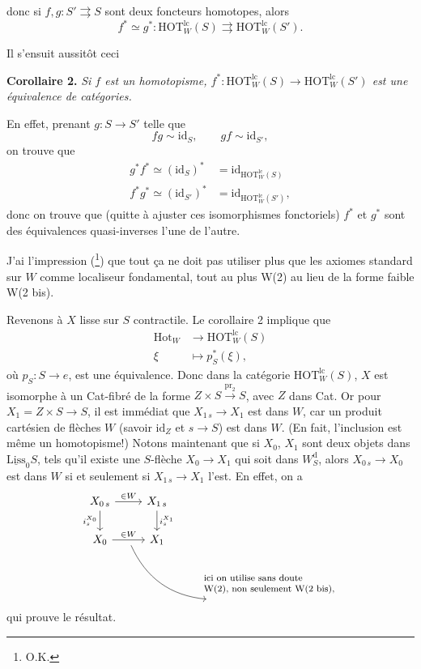 \documentclass[11pt]{article}
\newcommand{\printedpage}[1]{\marginpar{\footnotesize p.~#1}}
\newcommand{\msp}[1]{\marginpar{\footnotesize [#1]}}
\newcommand{\HOTlc}{\mathrm{HOT}^{\mathrm{lc}}_W}
\newcommand{\Hot}{\mathrm{Hot}}
\newcommand{\id}{\mathrm{id}}
\newcommand{\Wd}{W^{\mathrm{d}}_S}
\begin{document}
\printedpage{34}

\msp{page 46}
donc si $f,g : S' \rightrightarrows S$ sont deux foncteurs homotopes, alors
\[ f^* \simeq g^* : \HOTlc(S) \rightrightarrows \HOTlc(S'). \]

Il s'ensuit aussitôt ceci

\textbf{Corollaire 2.} \textit{Si $f$ est un homotopisme, $f^* : \HOTlc(S) \longrightarrow \HOTlc(S')$ est une équivalence de catégories.}

En effet, prenant $g : S \longrightarrow S'$ telle que
\[ fg \sim \id_S, \qquad gf \sim \id_{S'}, \]
on trouve que
\[ \begin{aligned}
g^*f^* \simeq (\id_S)^* &= \id_{\HOTlc(S)} \\
f^*g^* \simeq (\id_{S'})^* &= \id_{\HOTlc(S')},
\end{aligned} \]
donc on trouve que (quitte à ajuster ces isomorphismes fonctoriels) $f^*$ et $g^*$ sont des équivalences quasi-inverses l'une de l'autre.

J'ai l'impression (\footnote[54]{O.K.}) que tout ça ne doit pas utiliser plus que les axiomes standard sur $W$ comme localiseur fondamental, tout au plus W(2) au lieu de la forme faible W(2 bis).

Revenons à $X$ lisse sur $S$ contractile. Le corollaire 2 implique que
\[ \begin{aligned}
\Hot_W &\longrightarrow \HOTlc(S) \\
\xi &\longmapsto p^*_S(\xi),
\end{aligned} \]
où $p_S : S \longrightarrow e$, est une équivalence. Donc dans la catégorie $\HOTlc(S)$, $X$ est isomorphe \msp{page 47} à un Cat-fibré de la forme $Z \times S \xrightarrow{\mathrm{pr}_2} S$, avec $Z$ dans Cat. Or pour $X_1 = Z \times S \longrightarrow S$, il est immédiat que $X_{1\,s} \longrightarrow X_1$ est dans $W$, car un produit cartésien de flèches $W$ (savoir $\id_Z$ et $s \longrightarrow S$) est dans $W$. (En fait, l'inclusion est même un homotopisme!) Notons maintenant que si $X_0$, $X_1$ sont deux objets dans $\underline{\mathrm{Liss}}_0S$, tels qu'il existe une $S$-flèche $X_0 \longrightarrow X_1$ qui soit dans $\Wd$, alors $X_{0\,s} \longrightarrow X_0$ est dans $W$ si et seulement si $X_{1\,s} \longrightarrow X_1$ l'est. En effet, on a
\[ \begin{tikzcd}
X_{0\,s} \arrow[r, "\in W"] \arrow[d, "i_s^{X_0}"'] & X_{1\,s} \arrow[d, "i_s^{X_1}"] & \\
X_0 \arrow[r, "\in W", ""{name=A, below}] & X_1 & \\
 & & \text{\footnotesize\begin{tabular}{@{}l@{}}ici on utilise sans doute\\ W(2), non seulement W(2 bis),\end{tabular}}
\arrow[from=A, to=3-3, bend right]
\end{tikzcd} \]
\printedpage{35}
qui prouve le résultat.
\end{document}
